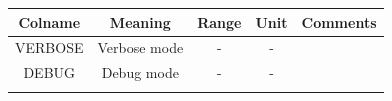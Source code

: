 \documentclass[]{scrbook}
\begin{document}
\begin{longtable}[]{@{}ccccc@{}}
\toprule
\begin{minipage}[b]{0.17\columnwidth}\centering\strut
Colname\strut
\end{minipage} & \begin{minipage}[b]{0.23\columnwidth}\centering\strut
Meaning\strut
\end{minipage} & \begin{minipage}[b]{0.10\columnwidth}\centering\strut
Range\strut
\end{minipage} & \begin{minipage}[b]{0.10\columnwidth}\centering\strut
Unit\strut
\end{minipage} & \begin{minipage}[b]{0.26\columnwidth}\centering\strut
Comments\strut
\end{minipage}\tabularnewline
\midrule
\endhead
\begin{minipage}[t]{0.17\columnwidth}\centering\strut
VERBOSE\strut
\end{minipage} & \begin{minipage}[t]{0.23\columnwidth}\centering\strut
Verbose mode\strut
\end{minipage} & \begin{minipage}[t]{0.10\columnwidth}\centering\strut
-\strut
\end{minipage} & \begin{minipage}[t]{0.10\columnwidth}\centering\strut
-\strut
\end{minipage} & \begin{minipage}[t]{0.26\columnwidth}\centering\strut
\strut
\end{minipage}\tabularnewline
\begin{minipage}[t]{0.17\columnwidth}\centering\strut
DEBUG\strut
\end{minipage} & \begin{minipage}[t]{0.23\columnwidth}\centering\strut
Debug mode\strut
\end{minipage} & \begin{minipage}[t]{0.10\columnwidth}\centering\strut
-\strut
\end{minipage} & \begin{minipage}[t]{0.10\columnwidth}\centering\strut
-\strut
\end{minipage} & \begin{minipage}[t]{0.26\columnwidth}\centering\strut
\strut
\end{minipage}\tabularnewline
\begin{minipage}[t]{0.17\columnwidth}\centering\strut

\end{minipage}
\end{longtable}
\end{document}

